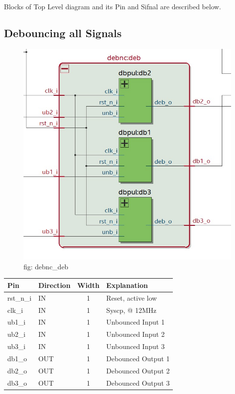 \documentclass[12pt,a4 paper] {article}
\begin{document}
Blocks of Top Level diagram and its Pin and Sifnal are described below. 

\subsection{Debouncing all Signals}	
\begin{figure}[h]
	\centering	
	\includegraphics[scale=0.3]{../png/debnc_deb.png}
	\newline
	fig: debnc\_deb \\
\end{figure}

\begin{center}
	\begin{tabular}{ | p{2cm} | p{2cm} | c| p{4cm} |}
	\hline
	Pin & Direction & Width & Explanation\\
	\hline
	  rst\_n\_i & IN & 1 & Reset, active low\\
	  \hline
	clk\_i   & IN  & 1 & Syscp, @ 12MHz \\
	\hline
	ub1\_i   & IN  &  1 &Unbounced Input 1 \\
	\hline
	ub2\_i   & IN  & 1 &  Unbounced Input 2 \\
	\hline
	ub3\_i   & IN  &  1 & Unbounced Input 3 \\
	\hline
	db1\_o   & OUT &  1 & Debounced Output 1\\
	\hline
	db2\_o   & OUT &  1 & Debounced Output 2\\
	\hline
	db3\_o   & OUT &  1 & Debounced Output 3\\
	\hline
	\end{tabular}
\end{center}
\newpage
\end{document}

